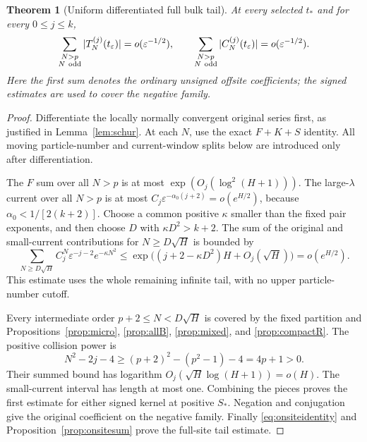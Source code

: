 \documentclass[11pt]{article}
\numberwithin{equation}{section}
\newtheorem{theorem}{Theorem}[section]
\theoremstyle{definition}
\newcommand{\eps}{\varepsilon}
\begin{document}
\begin{theorem}[Uniform differentiated full bulk tail]\label{thm:tail}
At every selected $t_*$ and for every $0\le j\le k$,
\[
 \sum_{\substack{N>p\\N\ {\rm odd}}}|T_N^{(j)}(t_\eps)|
 =o(\eps^{-1/2}),\qquad
 \sum_{\substack{N>p\\N\ {\rm odd}}}|C_N^{(j)}(t_\eps)|
 =o(\eps^{-1/2}).
\]
Here the first sum denotes the ordinary unsigned offsite coefficients;
the signed estimates are used to cover the negative family.
\end{theorem}
\begin{proof}
Differentiate the locally normally convergent original series first,
as justified in Lemma~\ref{lem:schur}. At each $N$, use the exact
$F+K+S$ identity. All moving particle-number and current-window
splits below are introduced only after differentiation.

The $F$ sum over all $N>p$ is at most
$\exp(O_j(\log^2(H+1)))$. The large-$\lambda$ current over all
$N>p$ is at most $C_j\eps^{-\alpha_0(j+2)}=o(e^{H/2})$,
because $\alpha_0<1/[2(k+2)]$.
Choose a common positive $\kappa$ smaller than the fixed pair
exponents, and then choose $D$ with $\kappa D^2>k+2$.
The sum of the original and small-current contributions for
$N\ge D\sqrt H$ is bounded by
\[
 \sum_{N\ge D\sqrt H}C_j^N\eps^{-j-2}e^{-\kappa N^2}
 \le \exp\bigl((j+2-\kappa D^2)H+O_j(\sqrt H)\bigr)
 =o(e^{H/2}).
\]
This estimate uses the whole remaining infinite tail, with no
upper particle-number cutoff.

Every intermediate order $p+2\le N<D\sqrt H$ is covered by the
fixed partition and Propositions~\ref{prop:micro}, \ref{prop:allB},
\ref{prop:mixed}, and \ref{prop:compactR}. The positive collision
power is
\[
 N^2-2j-4\ge(p+2)^2-(p^2-1)-4=4p+1>0.
\]
Their summed bound has logarithm
$O_j(\sqrt H\log(H+1))=o(H)$. The small-current interval has
length at most one. Combining the pieces proves the first estimate
for either signed kernel at positive $S_*$. Negation and
conjugation give the original coefficient on the negative family.
Finally \eqref{eq:onsiteidentity} and
Proposition~\ref{prop:onsitesum} prove the full-site tail estimate.
\end{proof}
\end{document}
